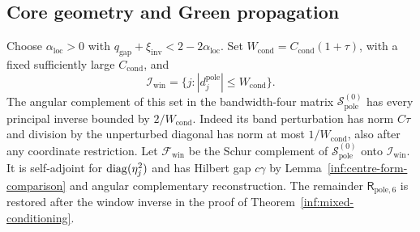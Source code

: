 \subsection{Core geometry and Green propagation}

Choose $\alpha_{\mathrm{loc}}>0$ with
$q_{\mathrm{gap}}+\xi_{\mathrm{inv}}<2-2\alpha_{\mathrm{loc}}$.
Set $W_{\mathrm{cond}}=C_{\mathrm{cond}}(1+\tau)$, with a fixed
sufficiently large $C_{\mathrm{cond}}$, and
\[
 \mathcal I_{\mathrm{win}}=\{j:|d_j^{\mathrm{pole}}|\le W_{\mathrm{cond}}\}.
\]
The angular complement of this set in the bandwidth-four matrix
$\mathcal S_{\mathrm{pole}}^{(0)}$ has every principal inverse
bounded by $2/W_{\mathrm{cond}}$. Indeed its band perturbation has
norm $C\tau$ and division by the unperturbed diagonal has norm at most
$1/W_{\mathrm{cond}}$, also after any coordinate restriction.
Let $\mathcal F_{\mathrm{win}}$ be the Schur complement of
$\mathcal S_{\mathrm{pole}}^{(0)}$ onto $\mathcal I_{\mathrm{win}}$.
It is self-adjoint for $\operatorname{diag}(\eta_j^2)$ and has Hilbert gap $c\gamma$
by Lemma~\ref{inf:centre-form-comparison} and angular complementary
reconstruction. The remainder $\mathsf R_{\mathrm{pole},6}$ is
restored after the window inverse in the proof of
Theorem~\ref{inf:mixed-conditioning}.

